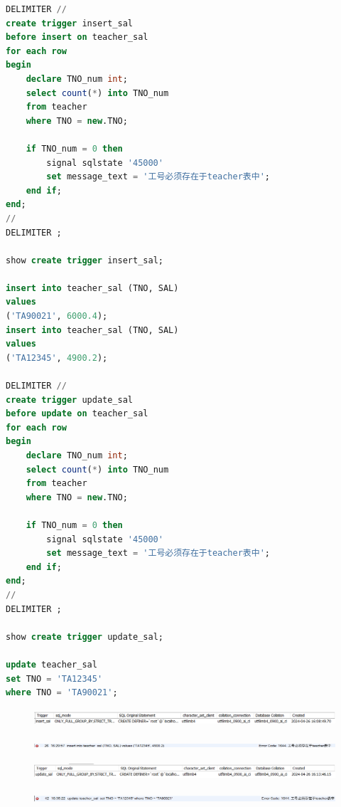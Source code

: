\documentclass{ctexart}
\begin{document}
\begin{lstlisting}[language=sql]
DELIMITER //
create trigger insert_sal
before insert on teacher_sal
for each row
begin
	declare TNO_num int;
	select count(*) into TNO_num
    from teacher
    where TNO = new.TNO;
    
    if TNO_num = 0 then
		signal sqlstate '45000'
        set message_text = '工号必须存在于teacher表中';
	end if;
end;
//
DELIMITER ;

show create trigger insert_sal;

insert into teacher_sal (TNO, SAL)
values
('TA90021', 6000.4);
insert into teacher_sal (TNO, SAL)
values
('TA12345', 4900.2);

DELIMITER //
create trigger update_sal
before update on teacher_sal
for each row
begin
	declare TNO_num int;
	select count(*) into TNO_num
    from teacher
    where TNO = new.TNO;
    
    if TNO_num = 0 then
		signal sqlstate '45000'
        set message_text = '工号必须存在于teacher表中';
	end if;
end;
//
DELIMITER ;

show create trigger update_sal;

update teacher_sal 
set TNO = 'TA12345'
where TNO = 'TA90021';
\end{lstlisting}
\begin{figure}[H]
	\centering 
	\includegraphics[height=0.6cm,width=16cm]{51.png}
	\end{figure}
	\begin{figure}[H]
		\centering 
		\includegraphics[height=0.3cm,width=16cm]{52.png}
		\end{figure}
		\begin{figure}[H]
			\centering 
			\includegraphics[height=0.6cm,width=16cm]{53.png}
			\end{figure}
			\begin{figure}[H]
				\centering 
				\includegraphics[height=0.3cm,width=16cm]{54.png}
				\end{figure}
\end{document}
